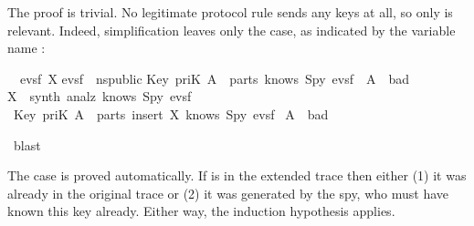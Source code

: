 \begin{isabellebody}
\begin{isamarkuptxt}
The proof is trivial.  No legitimate protocol rule sends any keys
at all, so only  is relevant. Indeed, simplification leaves
only the  case, as indicated by the variable name :
\begin{isabelle}%
\ {}{}\ {}evsf\ X{}\isanewline
{}evsf\ {}\ ns{}public{}\isanewline
{}Key\ {}priK\ A{}\ {}\ parts\ {}knows\ Spy\ evsf{}{}\ {}\ {}A\ {}\ bad{}{}\isanewline
{}X\ {}\ synth\ {}analz\ {}knows\ Spy\ evsf{}{}{}\isanewline
{}\ {}Key\ {}priK\ A{}\ {}\ parts\ {}insert\ X\ {}knows\ Spy\ evsf{}{}{}\ {}\isanewline
{}A\ {}\ bad{}%
\end{isabelle}%
\end{isamarkuptxt}%
\isamarkuptrue%
\isamarkupfalse%
\ blast%
\endisatagproof
{\isafoldproof}%
%
\isadelimproof
%
\endisadelimproof
%
\isadelimproof
%
\endisadelimproof
%
\isatagproof
%
\endisatagproof
{\isafoldproof}%
%
\isadelimproof
%
\endisadelimproof
%
\begin{isamarkuptext}%
The  case is proved automatically.  If
 is in the extended trace then either (1) it was already in the
original trace or (2) it was
generated by the spy, who must have known this key already. 
Either way, the induction hypothesis applies.


\end{isamarkuptext}
\end{isabellebody}
